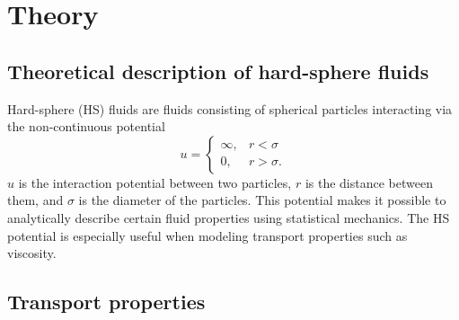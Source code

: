 \section{Theory}


\label{sec:theory}
\subsection{Theoretical description of hard-sphere fluids}
Hard-sphere (HS) fluids are fluids consisting of spherical particles interacting via the non-continuous potential 
\begin{equation}
    \label{eq:hard_sphere_potential}
    u = 
    \begin{cases}
        \infty, & r < \sigma \\
        0, & r > \sigma.
    \end{cases}
\end{equation}
$u$ is the interaction potential between two particles, $r$ is the distance between them, and $\sigma$ is the diameter of the particles. 
This potential makes it possible to analytically describe certain fluid properties using statistical mechanics. 
The HS potential is especially useful when modeling transport properties such as viscosity.


\subsection{Transport properties}



